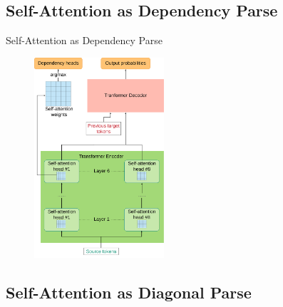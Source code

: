 \documentclass{beamer}
\begin{document}
\subsection{Self-Attention as Dependency Parse}

\begin{frame}{Self-Attention as Dependency Parse}
    \begin{figure}[t]
    \includegraphics[width=0.43\textwidth]{img/joint_model_compated}
\end{figure}
\end{frame}

\subsection{Self-Attention as Diagonal Parse}
\end{document}
